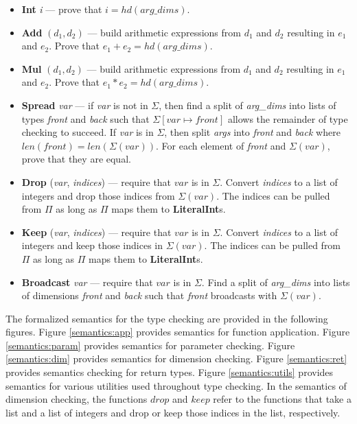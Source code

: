 \documentclass[12pt]{report}
\begin{document}
\begin{enumerate}[label=\arabic*.]
\begin{itemize}
        \item \textbf{Int} \textit{i} --- prove that $i = hd(arg\_dims)$.

        \item \textbf{Add} $(d_1, d_2)$ --- build arithmetic expressions from $d_1$ and $d_2$ resulting in $e_1$ and $e_2$. Prove that $e_1 + e_2 = hd(arg\_dims)$.

        \item \textbf{Mul} $(d_1, d_2)$ --- build arithmetic expressions from $d_1$ and $d_2$ resulting in $e_1$ and $e_2$. Prove that $e_1 * e_2 = hd(arg\_dims)$.

        \item \textbf{Spread} \textit{var} --- if \textit{var} is not in $\Sigma$, then find a split of \textit{arg\_dims} into lists of types \textit{front} and \textit{back} such that $\Sigma[var \mapsto front]$ allows the remainder of type checking to succeed. If \textit{var} is in $\Sigma$, then split \textit{args} into \textit{front} and \textit{back} where $len(front) = len(\Sigma(var))$. For each element of \textit{front} and $\Sigma(var)$, prove that they are equal.

        \item \textbf{Drop} (\textit{var}, \textit{indices}) --- require that $var$ is in $\Sigma$. Convert \textit{indices} to a list of integers and drop those indices from $\Sigma(var)$. The indices can be pulled from $\Pi$ as long as $\Pi$ maps them to \textbf{LiteralInt}s.

        \item \textbf{Keep} (\textit{var}, \textit{indices}) --- require that $var$ is in $\Sigma$. Convert \textit{indices} to a list of integers and keep those indices in $\Sigma(var)$. The indices can be pulled from $\Pi$ as long as $\Pi$ maps them to \textbf{LiteralInt}s.

        \item \textbf{Broadcast} \textit{var} --- require that $var$ is in $\Sigma$. Find a split of \textit{arg\_dims} into lists of dimensions \textit{front} and \textit{back} such that \textit{front} broadcasts with $\Sigma(var)$.

    \end{itemize}
\end{enumerate}
The formalized semantics for the type checking are provided in the following figures. Figure \ref{semantics:app} provides semantics for function application. Figure \ref{semantics:param} provides semantics for parameter checking. Figure \ref{semantics:dim} provides semantics for dimension checking. Figure \ref{semantics:ret} provides semantics checking for return types. Figure \ref{semantics:utils} provides semantics for various utilities used throughout type checking. In the semantics of dimension checking, the functions $drop$ and $keep$ refer to the functions that take a list and a list of integers and drop or keep those indices in the list, respectively.
\end{document}
